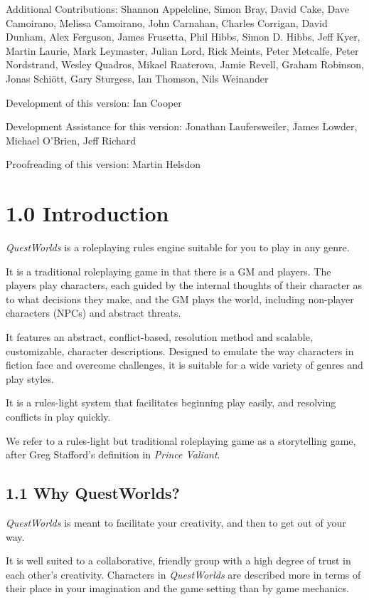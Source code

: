 \documentclass[
]{article}
\begin{document}
Additional Contributions: Shannon Appelcline, Simon Bray, David Cake,
Dave Camoirano, Melissa Camoirano, John Carnahan, Charles Corrigan,
David Dunham, Alex Ferguson, James Frusetta, Phil Hibbs, Simon D. Hibbs,
Jeff Kyer, Martin Laurie, Mark Leymaster, Julian Lord, Rick Meints,
Peter Metcalfe, Peter Nordstrand, Wesley Quadros, Mikael Raaterova,
Jamie Revell, Graham Robinson, Jonas Schiött, Gary Sturgess, Ian
Thomson, Nils Weinander

Development of this version: Ian Cooper

Development Assistance for this version: Jonathan Laufersweiler, James
Lowder, Michael O'Brien, Jeff Richard

Proofreading of this version: Martin Helsdon

\hypertarget{introduction}{%
\section{1.0 Introduction}\label{introduction}}

\emph{QuestWorlds} is a roleplaying rules engine suitable for you to
play in any genre.

It is a traditional roleplaying game in that there is a GM and players.
The players play characters, each guided by the internal thoughts of
their character as to what decisions they make, and the GM plays the
world, including non-player characters (NPCs) and abstract threats.

It features an abstract, conflict-based, resolution method and scalable,
customizable, character descriptions. Designed to emulate the way
characters in fiction face and overcome challenges, it is suitable for a
wide variety of genres and play styles.

It is a rules-light system that facilitates beginning play easily, and
resolving conflicts in play quickly.

We refer to a rules-light but traditional roleplaying game as a
storytelling game, after Greg Stafford's definition in \emph{Prince
Valiant}.

\hypertarget{why-questworlds}{%
\subsection{1.1 Why QuestWorlds?}\label{why-questworlds}}

\emph{QuestWorlds} is meant to facilitate your creativity, and then to
get out of your way.

It is well suited to a collaborative, friendly group with a high degree
of trust in each other's creativity. Characters in \emph{QuestWorlds}
are described more in terms of their place in your imagination and the
game setting than by game mechanics.
\end{document}
